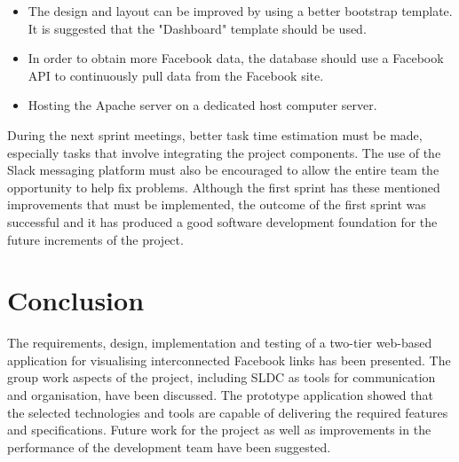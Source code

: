 \documentclass[12pt,onecolumn]{article}
\begin{document}
	\begin{itemize}
		\item The design and  layout can be improved by using a better bootstrap template. It is suggested that the "Dashboard" template should be used.
		\item In order to obtain more Facebook data, the database should use a Facebook API to continuously pull data from the Facebook site. 
		\item Hosting the Apache server on a dedicated host computer server.
	\end{itemize}

	During the next sprint meetings, better task time estimation must be made, especially tasks that involve integrating the project components. The use of the Slack messaging platform must also be encouraged to allow the entire team the opportunity to help fix problems. Although the first sprint has these mentioned improvements that must be implemented, the outcome of the first sprint was successful and it has produced a good software development foundation for the future increments of the project.


	\section{Conclusion}

	The requirements, design, implementation and testing of a two-tier web-based application for visualising interconnected Facebook links has been presented. The group work aspects of the project, including SLDC as tools for communication and organisation, have been discussed. The prototype application showed that the selected technologies and tools are capable of delivering the required features and specifications. Future work for the project as well as improvements in the performance of the development team have been suggested.
\end{document}

